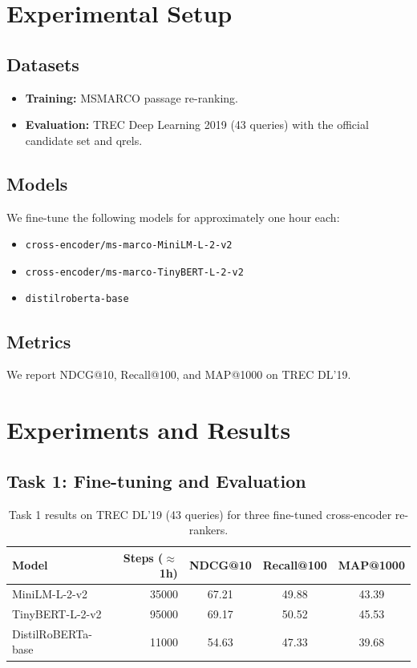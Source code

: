 \documentclass[sigconf]{acmart}
\begin{document}
\section{Experimental Setup}
\subsection{Datasets}
\begin{itemize}[leftmargin=*]
  \item \textbf{Training:} MSMARCO passage re-ranking.
  \item \textbf{Evaluation:} TREC Deep Learning 2019 (43 queries) with the official candidate set and qrels.
\end{itemize}

\subsection{Models}
We fine-tune the following models for approximately one hour each:
\begin{itemize}[leftmargin=*]
  \item \texttt{cross-encoder/ms-marco-MiniLM-L-2-v2}
  \item \texttt{cross-encoder/ms-marco-TinyBERT-L-2-v2}
  \item \texttt{distilroberta-base}
\end{itemize}

\subsection{Metrics}
We report NDCG@10, Recall@100, and MAP@1000 on TREC DL'19.

\section{Experiments and Results}
\subsection{Task 1: Fine-tuning and Evaluation}
\begin{table}[t]
\centering
\small
{}
\begin{tabular}{l r S S S}
\toprule
Model & Steps ($\approx$1h) & {NDCG@10} & {Recall@100} & {MAP@1000} \\
\midrule
MiniLM-L-2-v2      & 35000 & 67.21 & 49.88 & 43.39 \\
TinyBERT-L-2-v2    & 95000 & 69.17 & 50.52 & 45.53 \\
DistilRoBERTa-base & 11000 & 54.63 & 47.33 & 39.68 \\
\bottomrule
\end{tabular}
\caption{Task 1 results on TREC DL'19 (43 queries) for three fine-tuned cross-encoder re-rankers.}
\label{tab:task1}
\end{table}
\end{document}

